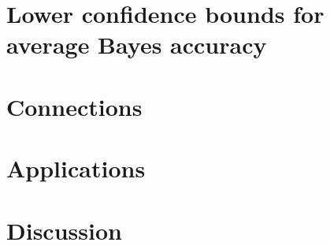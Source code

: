 \documentclass[12pt]{article}
\begin{document}
\section{Lower confidence bounds for average Bayes accuracy}









\section{Connections}\label{sec:connections}

\section{Applications}\label{sec:applications}

\section{Discussion}\label{sec:discussion}
\end{document}
